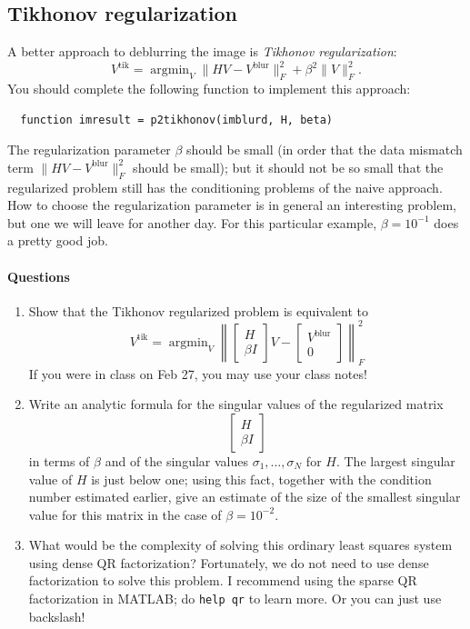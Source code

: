 \documentclass[12pt, leqno]{article} %
\begin{document}
\subsection{Tikhonov regularization}

A better approach to deblurring the image is {\em Tikhonov
  regularization}:
\[
  V^{\mathrm{tik}} = 
  \operatorname{argmin}_V \|HV-V^{\mathrm{blur}}\|_F^2 + \beta^2 \|V\|_F^2.
\]
You should complete the following function to implement this approach:
\begin{lstlisting}
  function imresult = p2tikhonov(imblurd, H, beta)
\end{lstlisting}
The regularization parameter $\beta$ should be small (in order that
the data mismatch term $\|HV-V^{\mathrm{blur}}\|_F^2$ should be
small); but it should not be so small that the regularized problem
still has the conditioning problems of the naive approach.  How to
choose the regularization parameter is in general an interesting
problem, but one we will leave for another day.  For this particular
example, $\beta = 10^{-1}$ does a pretty good job.

\paragraph*{Questions}
\begin{enumerate}
\item
  Show that the Tikhonov regularized problem is equivalent to
  \[
  V^{\mathrm{tik}} = \operatorname{argmin}_V
  \left\| 
    \begin{bmatrix} H \\ \beta I \end{bmatrix} V -
    \begin{bmatrix} V^{\mathrm{blur}} \\ 0 \end{bmatrix}
  \right\|_F^2
  \]
  If you were in class on Feb 27, you may use your class notes!
\item
  Write an analytic formula for the singular values of the regularized
  matrix
  \[
    \begin{bmatrix} H \\ \beta I \end{bmatrix}
  \]
  in terms of $\beta$ and of the singular values $\sigma_1, \ldots,
  \sigma_N$ for $H$.  The largest singular value of $H$ is just below
  one; using this fact, together with the condition number estimated
  earlier, give an estimate of the size of the smallest singular value
  for this matrix in the case of $\beta = 10^{-2}$.
\item
  What would be the complexity of solving this ordinary least
  squares system using dense QR factorization?
  Fortunately, we do not need to use dense factorization to solve this
  problem.  I recommend using the sparse QR factorization in MATLAB;
  do {\tt help qr} to learn more.  Or you can just use backslash!
\end{enumerate}
\end{document}

